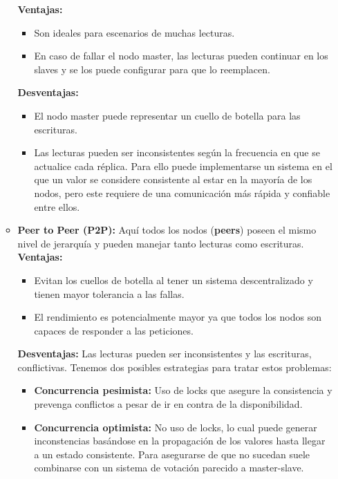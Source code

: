 \begin{itemize}
\begin{itemize}
        \textbf{Ventajas:}
        \begin{itemize}
            \item Son ideales para escenarios de muchas lecturas.
            \item En caso de fallar el nodo master, las lecturas pueden continuar en los slaves y se los puede configurar para que lo reemplacen.
        \end{itemize}
        \textbf{Desventajas:}
        \begin{itemize}
            \item El nodo master puede representar un cuello de botella para las escrituras.
            \item Las lecturas pueden ser inconsistentes según la frecuencia en que se actualice cada réplica. Para ello puede implementarse un sistema en el que un valor se considere consistente al estar en la mayoría de los nodos, pero este requiere de una comunicación más rápida y confiable entre ellos.
        \end{itemize}
        \item \textbf{Peer to Peer (P2P):} Aquí todos los nodos (\textbf{peers}) poseen el mismo nivel de jerarquía y pueden manejar tanto lecturas como escrituras. \\
        \textbf{Ventajas:}
        \begin{itemize}
            \item Evitan los cuellos de botella al tener un sistema descentralizado y tienen mayor tolerancia a las fallas.
            \item El rendimiento es potencialmente mayor ya que todos los nodos son capaces de responder a las peticiones.
        \end{itemize}
        \textbf{Desventajas:} Las lecturas pueden ser inconsistentes y las escrituras, conflictivas. Tenemos dos posibles estrategias para tratar estos problemas:
        \begin{itemize}
            \item \textbf{Concurrencia pesimista:} Uso de locks que asegure la consistencia y prevenga conflictos a pesar de ir en contra de la disponibilidad.
            \item \textbf{Concurrencia optimista:} No uso de locks, lo cual puede generar inconstencias basándose en la propagación de los valores hasta llegar a un estado consistente. Para asegurarse de que no sucedan suele  combinarse con un sistema de votación parecido a master-slave.
        \end{itemize}
    \end{itemize}
\end{itemize}

